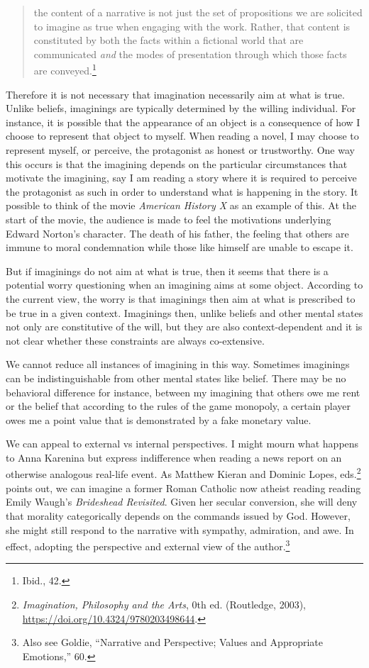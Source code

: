 \documentclass[phdthesis,12pt,final,a4paper]{wuthesis}
\theoremstyle{definition}
\theoremstyle{definition}
\theoremstyle{definition}
\theoremstyle{definition}
\theoremstyle{remark}
\begin{document}
\begin{quote}
the content of a narrative is not just the set of propositions we are solicited to imagine as true when engaging with the work. Rather, that content is constituted by both the facts within a fictional world that are communicated \emph{and} the modes of presentation through which those facts are conveyed.\footnote{Ibid., 42.}
\end{quote}

Therefore it is not necessary that imagination necessarily aim at what is true. Unlike beliefs, imaginings are typically determined by the willing individual. For instance, it is possible that the appearance of an object is a consequence of how I choose to represent that object to myself. When reading a novel, I may choose to represent myself, or perceive, the protagonist as honest or trustworthy. One way this occurs is that the imagining depends on the particular circumstances that motivate the imagining, say I am reading a story where it is required to perceive the protagonist as such in order to understand what is happening in the story. It possible to think of the movie \emph{American History X} as an example of this. At the start of the movie, the audience is made to feel the motivations underlying Edward Norton's character. The death of his father, the feeling that others are immune to moral condemnation while those like himself are unable to escape it.

But if imaginings do not aim at what is true, then it seems that there is a potential worry questioning when an imagining aims at some object. According to the current view, the worry is that imaginings then aim at what is prescribed to be true in a given context. Imaginings then, unlike beliefs and other mental states not only are constitutive of the will, but they are also context-dependent and it is not clear whether these constraints are always co-extensive.

We cannot reduce all instances of imagining in this way. Sometimes imaginings can be indistinguishable from other mental states like belief. There may be no behavioral difference for instance, between my imagining that others owe me rent or the belief that according to the rules of the game monopoly, a certain player owes me a point value that is demonstrated by a fake monetary value.

We can appeal to external vs internal perspectives. I might mourn what happens to Anna Karenina but express indifference when reading a news report on an otherwise analogous real-life event. As Matthew Kieran and Dominic Lopes, eds.\footnote{\emph{Imagination, {Philosophy} and the {Arts}}, 0th ed. (Routledge, 2003), \url{https://doi.org/10.4324/9780203498644}.} points out, we can imagine a former Roman Catholic now atheist reading reading Emily Waugh's \emph{Brideshead Revisited}. Given her secular conversion, she will deny that morality categorically depends on the commands issued by God. However, she might still respond to the narrative with sympathy, admiration, and awe. In effect, adopting the perspective and external view of the author.\footnote{Also see Goldie, {``Narrative and {Perspective}; {Values} and {Appropriate Emotions},''} 60.}
\end{document}
